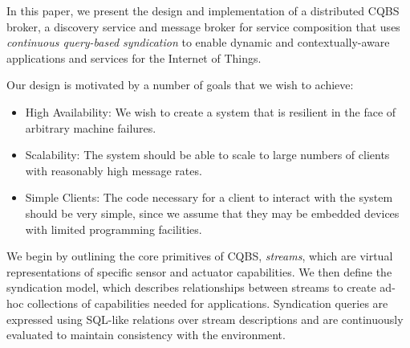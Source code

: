 In this paper, we present the design and implementation of a distributed CQBS broker, a discovery service and message broker for service composition that uses \emph{continuous query-based syndication} to enable dynamic and contextually-aware applications and services for the Internet of Things.

Our design is motivated by a number of goals that we wish to achieve:
\begin{itemize}
\item High Availability: We wish to create a system that is resilient in the face of arbitrary machine failures.
\item Scalability: The system should be able to scale to large numbers of clients with reasonably high message rates.
\item Simple Clients: The code necessary for a client to interact with the system should be very simple, since we assume that they may be embedded devices with limited programming facilities.
\end{itemize}

We begin by outlining the core primitives of CQBS, \emph{streams}, which are virtual representations of specific sensor and actuator capabilities.
We then define the syndication model, which describes relationships between streams to create ad-hoc collections of capabilities needed for applications.
Syndication queries are expressed using SQL-like relations over stream descriptions and are continuously evaluated to maintain consistency with the environment.


